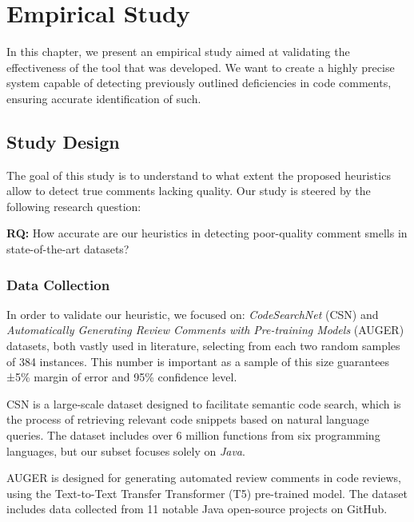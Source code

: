 
\chapter{Empirical Study} %

\label{Chapter4}


In this chapter, we present an empirical study aimed at validating the effectiveness of the tool that was developed. We want to create a highly precise system capable of detecting previously outlined deficiencies in code comments, ensuring accurate identification of such.

\section{Study Design}
The goal of this study is to understand to what extent the proposed heuristics allow to detect true comments lacking quality. Our study is steered by the following research
question:
\begin{large}
	\begin{Center}
		\textbf{RQ:} How accurate are our heuristics in detecting poor-quality comment smells in state-of-the-art datasets?
	\end{Center}
\end{large}

\subsection{Data Collection}
In order to validate our heuristic, we focused on: \textit{CodeSearchNet} (CSN) \cite{CSN} and \textit{Automatically Generating Review Comments with Pre-training Models} (AUGER) \cite{AUGER} datasets, both vastly used in literature, selecting from each two random samples of 384 instances.
This number is important as a sample of this size guarantees ±5\% margin of error and 95\% confidence level.

\noindent CSN is a large-scale dataset designed to facilitate semantic code search, which is the process of retrieving relevant code snippets based on natural language queries.
The dataset includes over 6 million functions from six programming languages, but our subset focuses solely on \textit{Java}.

\noindent AUGER is designed for generating automated review comments in code reviews, using the Text-to-Text Transfer Transformer (T5) pre-trained model. The dataset includes data collected from 11 notable Java open-source projects on GitHub.

